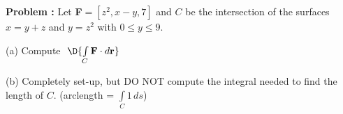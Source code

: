 {\bf Problem :} Let {\bf F}$=[z^2,x-y,7]$ and $C$ be the intersection of the surfaces $x=y+z$ and $y=z^2$ with $0 \le y \le 9$.

(a) \quad Compute \,\,$\D{\int \limits_{C} {\bf F} \cdot d{\bf r}}$

\vspace{10.2cm}

(b) \quad Completely set-up, but DO NOT compute the integral needed to find the length of $C$.  (arclength = $\int \limits_{C} 1 \, ds$)